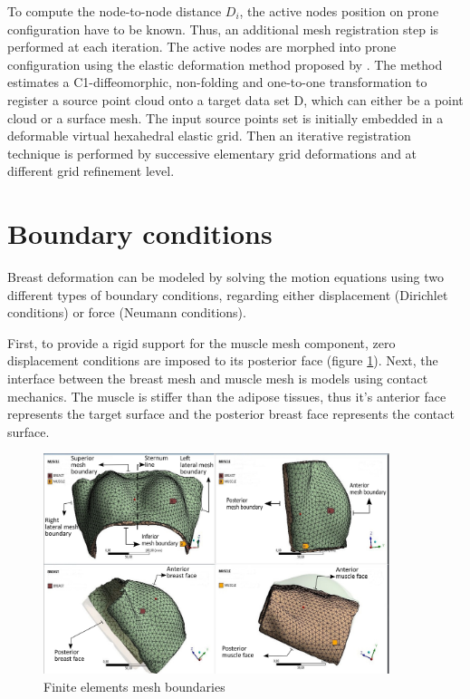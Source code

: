 To compute the node-to-node distance $D_i$, the active nodes position on prone configuration have to be known. Thus, an additional mesh registration step is performed at each iteration. The active nodes are morphed into prone configuration using the elastic deformation method proposed by \cite{bucki_fast_2010}. The method estimates a C1-diffeomorphic, non-folding and one-to-one transformation to register a source point cloud onto a target data set D, which can either be a point cloud or a surface mesh.  The input source points set is initially embedded in a deformable virtual hexahedral elastic grid. Then an iterative registration technique is performed by successive elementary grid deformations and at different grid refinement level. 

\section{Boundary conditions}\label{section:myBoundayconditions}

Breast deformation can be modeled by solving the
motion equations using two different types of boundary
conditions, regarding either displacement (Dirichlet conditions) or force (Neumann conditions).

First, to provide a rigid support for the muscle mesh component, zero displacement conditions are imposed to its posterior face  (figure \ref{fig:meshboundaries}). Next, the interface between the breast mesh and muscle mesh is models using contact mechanics. The muscle is stiffer than the adipose tissues, thus it's anterior face represents the target surface and the posterior breast face represents the contact surface. 

\begin{figure}[!h]
\centering
\includegraphics[width=0.9\textwidth,keepaspectratio]{figures/mesh_parts_2.png} 
\caption{Finite elements mesh boundaries}\label{fig:meshboundaries}
\end{figure}

